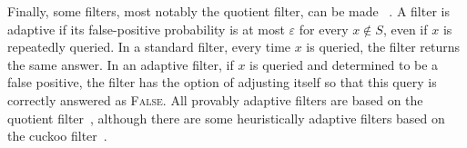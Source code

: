 Finally, some filters, most notably the quotient filter, can be made ~\cite{BenderFaGo18}.  A filter is adaptive if its false-positive probability is at most $\varepsilon$ for every $x\notin S$, even if $x$ is repeatedly queried.  In a standard filter, every time $x$ is queried, the filter returns the same answer.  In an adaptive filter, if $x$ is queried and determined to be a false positive, the filter has the option of adjusting itself so that this query is correctly answered as \textsc{False}.  All provably adaptive filters are based on the quotient filter~\cite{BenderFaGo18,Lee21}, although there are some heuristically adaptive filters based on the cuckoo filter~\cite{Mitzenmacher2020}.





